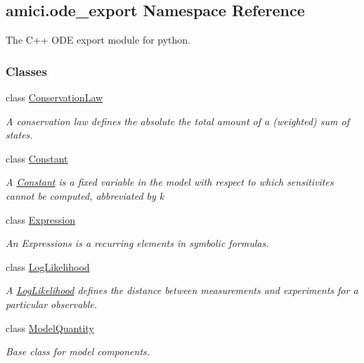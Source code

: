 \hypertarget{namespaceamici_1_1ode__export}{}\subsection{amici.\+ode\+\_\+export Namespace Reference}
\label{namespaceamici_1_1ode__export}


The C++ O\+DE export module for python.  


\subsubsection*{Classes}
\begin{DoxyCompactItemize}
\item 
class \mbox{\hyperlink{classamici_1_1ode__export_1_1_conservation_law}{Conservation\+Law}}
\begin{DoxyCompactList}\small\item\em A conservation law defines the absolute the total amount of a (weighted) sum of states. \end{DoxyCompactList}\item 
class \mbox{\hyperlink{classamici_1_1ode__export_1_1_constant}{Constant}}
\begin{DoxyCompactList}\small\item\em A \mbox{\hyperlink{classamici_1_1ode__export_1_1_constant}{Constant}} is a fixed variable in the model with respect to which sensitivites cannot be computed, abbreviated by {\ttfamily k} \end{DoxyCompactList}\item 
class \mbox{\hyperlink{classamici_1_1ode__export_1_1_expression}{Expression}}
\begin{DoxyCompactList}\small\item\em An Expressions is a recurring elements in symbolic formulas. \end{DoxyCompactList}\item 
class \mbox{\hyperlink{classamici_1_1ode__export_1_1_log_likelihood}{Log\+Likelihood}}
\begin{DoxyCompactList}\small\item\em A \mbox{\hyperlink{classamici_1_1ode__export_1_1_log_likelihood}{Log\+Likelihood}} defines the distance between measurements and experiments for a particular observable. \end{DoxyCompactList}\item 
class \mbox{\hyperlink{classamici_1_1ode__export_1_1_model_quantity}{Model\+Quantity}}
\begin{DoxyCompactList}\small\item\em Base class for model components. \end{DoxyCompactList}\item 

\end{DoxyCompactItemize}
